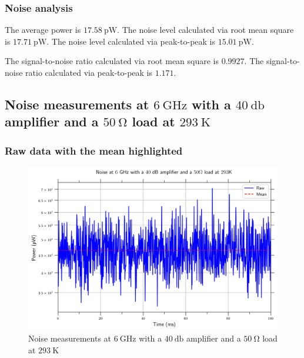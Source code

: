 \documentclass[english,12pt,a4paper]{article}
\begin{document}
\hypertarget{noise-analysis}{%
	\subsubsection{Noise analysis}\label{noise-analysis_3}}


	The average power is $\qty{17.58}{\pico\watt}$.
	The noise level calculated via root mean square is $\qty{17.71}{\pico\watt}$.
	The noise level calculated via peak-to-peak is $\qty{15.01}{\pico\watt}$.
	
	The signal-to-noise ratio calculated via root mean square is $0.9927$.
	The signal-to-noise ratio calculated via peak-to-peak is $1.171$.


\hypertarget{noise-measurements-at-6-ghz-with-a-40-db-amplifier-and-a-50-omega-load-at-293k}{%
	\subsection{Noise measurements at $\qty{6}{\giga\hertz}$ with a $\qty{40}{\decibel}$ amplifier and a $\qty{50}{\ohm}$ load at $\qty{293}{\kelvin}$}\label{noise-measurements-at-6-ghz-with-a-40-db-amplifier-and-a-50-omega-load-at-293k}}

 

\hypertarget{raw-data-with-the-mean-highlighted}{%
	\subsubsection{Raw data with the mean
		highlighted}\label{raw-data-with-the-mean-highlighted_3}}

\begin{figure}[H]
	\includegraphics[width=1\linewidth]{Plots/noise_floor_6_GHz_amplif_50ohm_rt}
	\caption{Noise measurements at $\qty{6}{\giga\hertz}$ with a $\qty{40}{\decibel}$ amplifier and a $\qty{50}{\ohm}$ load at $\qty{293}{\kelvin}$}
	\label{fig:noisefloor6ghzamplif50ohmrt}
\end{figure}
\end{document}
